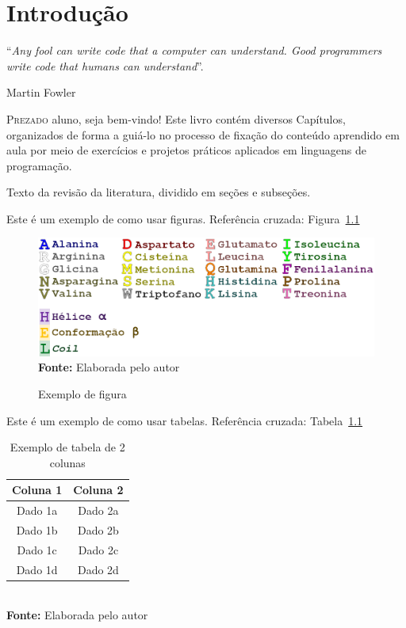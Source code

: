 \chapter{Introdução}
\epigraph{``\textit{Any fool can write code that a computer can understand. Good programmers write code that humans can understand}''.}{Martin Fowler}

\lettrine[lines=4, lhang=0.1, lraise=0, loversize=0.2, findent=0.1em]{\textcolor{niceblue}{P}}{rezado} aluno, seja bem-vindo! Este livro contém diversos Capítulos, organizados de forma a guiá-lo no processo de fixação do conteúdo aprendido em aula por meio de exercícios e projetos práticos aplicados em linguagens de programação.

Texto da revisão da literatura, dividido em seções e subseções.


Este é um exemplo de como usar figuras. Referência cruzada: Figura~\ref{fig:exemplo}

\FloatBarrier
\begin{figure}[!htbp]
    \centering
    \caption{Exemplo de figura}
    \includegraphics[scale=1.5]{imagens/teste}
    \\\textbf{Fonte:} Elaborada pelo autor
    \label{fig:exemplo}
\end{figure}
\FloatBarrier

Este é um exemplo de como usar tabelas. Referência cruzada: Tabela~\ref{tab:exemplo}

\FloatBarrier
\begin{table}[!htbp]
    \centering
    \caption{Exemplo de tabela de 2 colunas}
    \begin{tabular}{ c | c }
        \hline
        \textbf{Coluna 1} & \textbf{Coluna 2} \\ \hline
        Dado 1a           & Dado 2a           \\ \hline
        Dado 1b           & Dado 2b           \\ \hline
        Dado 1c           & Dado 2c           \\ \hline
        Dado 1d           & Dado 2d           \\ \hline
    \end{tabular}
    \\ \vspace{0.2cm}
    \textbf{Fonte:} Elaborada pelo autor
    \label{tab:exemplo}
\end{table}
\FloatBarrier


